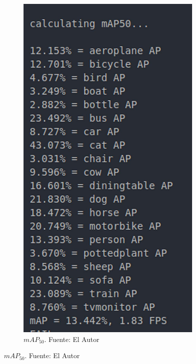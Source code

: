 \begin{figure}[H]
     \centering
     \begin{subfigure}[b]{0.4\textwidth}
        \centering
        \includegraphics[scale=0.15]{Recursos/mAP50_result.jpg}
        \caption[$mAP_{50}$.]{$mAP_{50}$. {\footnotesize Fuente: El Autor}}

\end{subfigure}
\end{figure}
